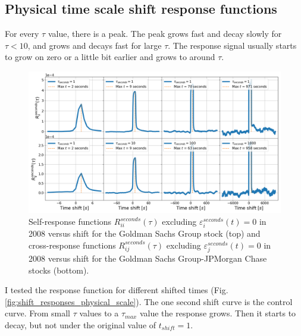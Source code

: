 \subsection{Physical time scale shift response functions}
\label{subsec:time_shift_physical}

For every $\tau$ value, there is a peak. The peak grows fast and decay slowly
for $\tau < 10$, and grows and decays fast for large $\tau$. The response
signal usually starts to grow on zero or a little bit earlier and grows to
around $\tau$.

\begin{figure}[htbp]
    \centering
    \includegraphics[width=\textwidth]{figures/04_shift_time.png}
    \caption{Self-response functions $R_{ii}^{seconds}\left(\tau\right)$
             excluding $\varepsilon^{seconds}_{i}\left(t\right) = 0$ in 2008
             versus shift for the Goldman Sachs Group stock (top) and
             cross-response functions $R_{ij}^{seconds}\left(\tau\right)$
             excluding $\varepsilon^{seconds}_{j}\left(t\right) = 0$ in 2008
             versus shift for the Goldman Sachs Group-JPMorgan Chase stocks
             (bottom).}
    \label{fig:shift_physical_scale}
\end{figure}

I tested the response function for different shifted times (Fig.
\ref{fig:shift_responses_physical_scale}). The one second shift curve is the control curve. From small
$\tau$ values to a $\tau_{max}$ value the response grows. Then it starts to decay, but not under the
original value of $t_{shift} = 1$.

